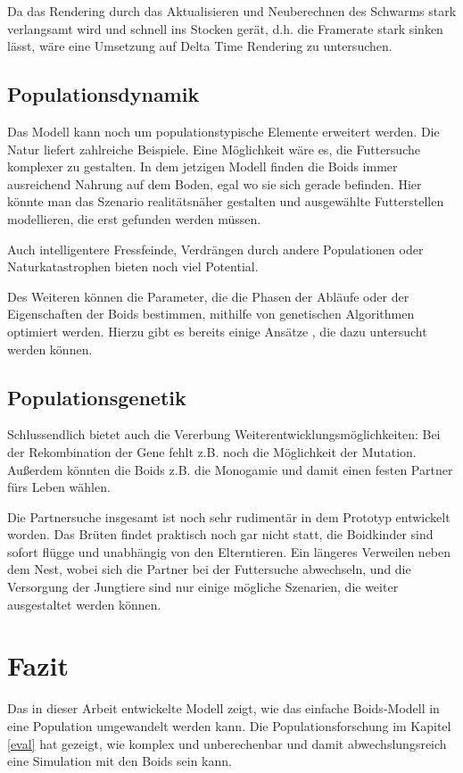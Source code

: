 \documentclass[draft=false
              ,paper=a4
              ,twoside=false
              ,fontsize=11pt
              ,headsepline
              ,BCOR10mm
              ,DIV11
              ,bibtotoc
              ,liststotoc
              ]{scrbook}
\begin{document}
Da das Rendering durch das Aktualisieren und Neuberechnen des Schwarms stark verlangsamt wird und schnell ins Stocken gerät, d.h. die Framerate stark sinken lässt, wäre eine Umsetzung auf Delta Time Rendering zu untersuchen.

\subsection{Populationsdynamik}
Das Modell kann noch um populationstypische Elemente erweitert werden. Die Natur liefert zahlreiche Beispiele. Eine Möglichkeit wäre es, die Futtersuche komplexer zu gestalten. In dem jetzigen Modell finden die Boids immer ausreichend Nahrung auf dem Boden, egal wo sie sich gerade befinden. Hier könnte man das Szenario realitätsnäher gestalten und ausgewählte Futterstellen modellieren, die erst gefunden werden müssen.

Auch intelligentere Fressfeinde, Verdrängen durch andere Populationen oder Naturkatastrophen bieten noch viel Potential.

Des Weiteren können die Parameter, die die Phasen der Abläufe oder der Eigenschaften der Boids bestimmen, mithilfe von genetischen Algorithmen optimiert werden. Hierzu gibt es bereits einige Ansätze \cite{sab92:reynolds}\cite{oai:CiteSeerXPSU:10.1.1.61.9858}\cite{conf/ecms/AlaliyatYS14}, die dazu untersucht werden können.

\subsection{Populationsgenetik}
Schlussendlich bietet auch die Vererbung Weiterentwicklungsmöglichkeiten: Bei der Rekombination der Gene fehlt z.B. noch die Möglichkeit der Mutation. Außerdem könnten die Boids z.B. die Monogamie und damit einen festen Partner fürs Leben wählen.

Die Partnersuche insgesamt ist noch sehr rudimentär in dem Prototyp entwickelt worden. Das Brüten findet praktisch noch gar nicht statt, die Boidkinder sind sofort flügge und unabhängig von den Elterntieren. Ein längeres Verweilen neben dem Nest, wobei sich die Partner bei der Futtersuche abwechseln, und die Versorgung der Jungtiere sind nur einige mögliche Szenarien, die weiter ausgestaltet werden können.

\section{Fazit}
Das in dieser Arbeit entwickelte Modell zeigt, wie das einfache Boids-Modell in eine Population umgewandelt werden kann. Die Populationsforschung im Kapitel \ref{eval} hat gezeigt, wie komplex und unberechenbar und damit abwechslungsreich eine Simulation mit den Boids sein kann.
\end{document}
